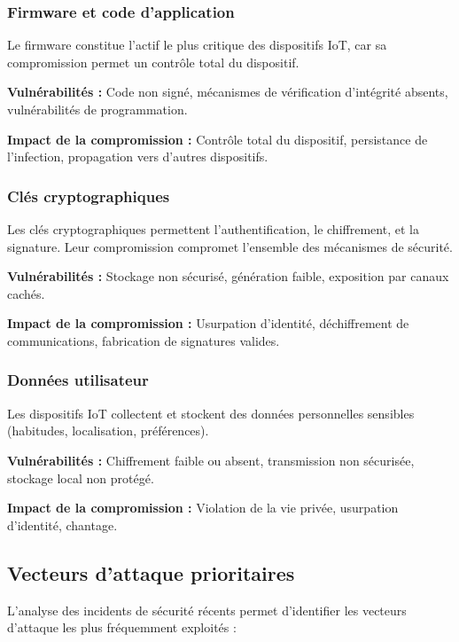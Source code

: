 \subsubsection{Firmware et code d'application}

Le firmware constitue l'actif le plus critique des dispositifs IoT, car sa compromission permet un contrôle total du dispositif.

\textbf{Vulnérabilités :} Code non signé, mécanismes de vérification d'intégrité absents, vulnérabilités de programmation.

\textbf{Impact de la compromission :} Contrôle total du dispositif, persistance de l'infection, propagation vers d'autres dispositifs.

\subsubsection{Clés cryptographiques}

Les clés cryptographiques permettent l'authentification, le chiffrement, et la signature. Leur compromission compromet l'ensemble des mécanismes de sécurité.

\textbf{Vulnérabilités :} Stockage non sécurisé, génération faible, exposition par canaux cachés.

\textbf{Impact de la compromission :} Usurpation d'identité, déchiffrement de communications, fabrication de signatures valides.

\subsubsection{Données utilisateur}

Les dispositifs IoT collectent et stockent des données personnelles sensibles (habitudes, localisation, préférences).

\textbf{Vulnérabilités :} Chiffrement faible ou absent, transmission non sécurisée, stockage local non protégé.

\textbf{Impact de la compromission :} Violation de la vie privée, usurpation d'identité, chantage.

\subsection{Vecteurs d'attaque prioritaires}

L'analyse des incidents de sécurité récents permet d'identifier les vecteurs d'attaque les plus fréquemment exploités :

